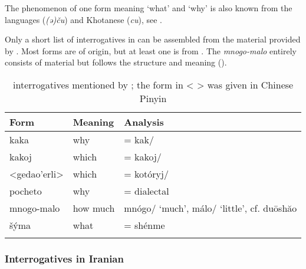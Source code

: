 The phenomenon of one form meaning ‘what’ and ‘why’ is also known from the  languages  (\textit{(ə)ču}) and Khotanese (\textit{cu}), see .

Only a short list of interrogatives in  can be assembled from the material provided by \citet{Shapiro2010}. Most forms are of  origin, but at least one is from . The  \textit{mnogo-malo} entirely consists of  material but follows the  structure and meaning ().

\begin{table}
\caption{ interrogatives mentioned by \cite{Shapiro2010}; the form in < > was given in Chinese Pinyin}
\label{tab:indo:16}

\begin{tabularx}{\textwidth}{llQ}
\lsptoprule 
\textbf{Form} & \textbf{Meaning} & \textbf{Analysis}\\
\midrule
kaka & why & =  kak/\\
kakoj & which & =  kakoj/\\
<gedao’erli> & which & =  kotóryj/\\
pocheto & why & = dialectal \\
mnogo-malo & how much &  mnógo/ ‘much’, málo/ ‘little’, cf.  du\=oshăo \\
šýma & what & =  shénme \\
\lspbottomrule
\end{tabularx}
\end{table}

\subsubsection{Interrogatives in Iranian}\label{sec:5.5.3.4}

